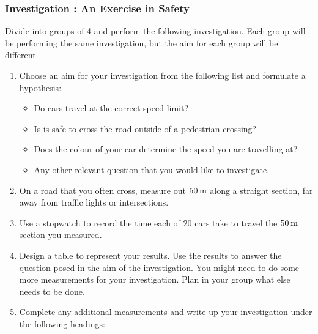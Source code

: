             \subsubsection{  Investigation : An Exercise in Safety }
            \nopagebreak
            
        \label{m38791*id67213}Divide into groups of 4 and perform the following investigation. Each group will be performing the same investigation, but the aim for each group will be different.\par 
        \label{m38791*id67220}\begin{enumerate}[noitemsep, label=\textbf{\arabic*}. ] 
            \label{m38791*uid57}\item Choose an aim for your investigation from the following list and formulate a hypothesis:
\label{m38791*id67236}\begin{itemize}[noitemsep]
            \label{m38791*uid58}\item Do cars travel at the correct speed limit?
\label{m38791*uid59}\item Is is safe to cross the road outside of a pedestrian crossing?
\label{m38791*uid60}\item Does the colour of your car determine the speed you are travelling at?
\label{m38791*uid61}\item Any other relevant question that you would like to investigate.
\end{itemize}
        \label{m38791*uid62}\item On a road that you often cross, measure out \begin{math}50\phantom{\rule{2pt}{0ex}}\mathrm{m}\end{math} along a straight section, far away from traffic lights or intersections.
\label{m38791*uid63}\item Use a stopwatch to record the time each of 20 cars take to travel the \begin{math}50\phantom{\rule{2pt}{0ex}}\mathrm{m}\end{math} section you measured.
\label{m38791*uid64}\item Design a table to represent your results. Use the results to answer the question posed in the aim of the investigation. You might need to do some more measurements for your investigation. Plan in your group what else needs to be done.
\label{m38791*uid65}\item Complete any additional measurements and write up your investigation under the following headings:
\label{m38791*id67343}\begin{itemize}[noitemsep]

\end{itemize}
\end{enumerate}
